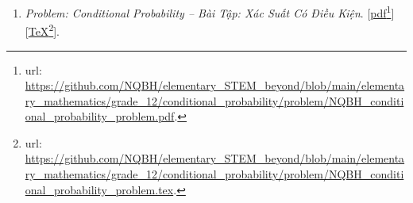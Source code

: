\documentclass[12pt,oneside]{book}
\begin{document}
\begin{enumerate}
	Folder: {\sf Elementary STEM \& Beyond{\tt/}Elementary Mathematics{\tt/}grade 12{\tt/}plane, line, sphere equations{\tt/}problem}.
	\begin{itemize}
		\item {\it Problem \& Solution: Equations of Plane, Line, {\it\&} Sphere in 3D Space -- Bài Tập \& Lời Giải: Phương Trình Mặt Phẳng, Đường Thẳng, Mặt Cầu Trong Không Gian}. [\href{https://github.com/NQBH/elementary_STEM_beyond/blob/main/elementary_mathematics/grade_12/3D_plane_line_sphere_equation/solution/NQBH_3D_plane_line_sphere_equation_solution.pdf}{pdf}\footnote{{\sc url}: \url{https://github.com/NQBH/elementary_STEM_beyond/blob/main/elementary_mathematics/grade_12/3D_plane_line_sphere_equation/solution/NQBH_3D_plane_line_sphere_equation_solution.pdf}.}][\href{https://github.com/NQBH/elementary_STEM_beyond/blob/main/elementary_mathematics/grade_12/3D_plane_line_sphere_equation/solution/NQBH_3D_plane_line_sphere_equation_solution.tex}{\TeX}\footnote{{\sc url}: \url{https://github.com/NQBH/elementary_STEM_beyond/blob/main/elementary_mathematics/grade_12/3D_plane_line_sphere_equation/solution/NQBH_3D_plane_line_sphere_equation_solution.tex}.}].
		
		Folder: {\sf Elementary STEM \& Beyond{\tt/}Elementary Mathematics{\tt/}grade 12{\tt/}plane, line, sphere equations{\tt/}solution}.
	\end{itemize}
	\item {\it Problem: Conditional Probability -- Bài Tập: Xác Suất Có Điều Kiện}. [\href{https://github.com/NQBH/elementary_STEM_beyond/blob/main/elementary_mathematics/grade_12/conditional_probability/problem/NQBH_conditional_probability_problem.pdf}{pdf}\footnote{{\sc url}: \url{https://github.com/NQBH/elementary_STEM_beyond/blob/main/elementary_mathematics/grade_12/conditional_probability/problem/NQBH_conditional_probability_problem.pdf}.}][\href{https://github.com/NQBH/elementary_STEM_beyond/blob/main/elementary_mathematics/grade_12/conditional_probability/problem/NQBH_conditional_probability_problem.tex}{\TeX}\footnote{{\sc url}: \url{https://github.com/NQBH/elementary_STEM_beyond/blob/main/elementary_mathematics/grade_12/conditional_probability/problem/NQBH_conditional_probability_problem.tex}.}].
	

\end{enumerate}
\end{document}
